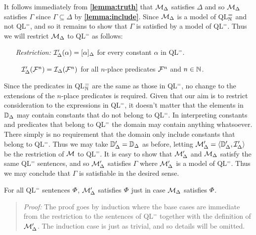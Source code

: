 It follows immediately from \textbf{\ref{lemma:truth}} that $\mathcal{M}_\Delta$ satisfies $\Delta$ and so $\mathcal{M}_\Delta$ satisfies $\Gamma$ since $\Gamma\subseteq\Delta$ by \textbf{\ref{lemma:include}}. 
Since $\mathcal{M}_\Delta$ is a model of QL$^=_{\mathbb{N}}$ and not QL$^=$, and so it remains to show that $\Gamma$ is satisfied by a model of QL$^=$.
Thus we will restrict $\mathcal{M}_\Delta$ to QL$^=$ as follows: 
  \begin{enumerate}[leftmargin=1.5in]
    \item[\it Restriction:] $\mathcal{I}'_\Delta(\alpha)=[\alpha]_\Delta$ for every constant $\alpha$ in QL$^=$.
    \item[~] $\mathcal{I}'_\Delta(\mathcal{F}^n)=\mathcal{I}_\Delta(\mathcal{F}^n)$ for all $n$-place predicates $\mathcal{F}^n$ and $n\in\mathbb{N}$. 
  \end{enumerate}
Since the predicates in QL$^=_{\mathbb{N}}$ are the same as those in QL$^=$, no change to the extensions of the $n$-place predicates is required.
Given that our aim is to restrict consideration to the expressions in QL$^=$, it doesn't matter that the elements in $\mathbb{D}_\Delta$ may contain constants that do not belong to QL$^=$.
In interpreting constants and predicates that belong to QL$^=$ the domain may contain anything whatsoever.
There simply is no requirement that the domain only include constants that belong to QL$^=$.
Thus we may take $\mathbb{D}'_\Delta=\mathbb{D}_\Delta$ as before, letting $\mathcal{M}'_\Delta=\langle\mathbb{D}'_\Delta,\mathcal{I}'_\Delta\rangle$ be the restriction of $\mathcal{M}$ to QL$^=$. 
It is easy to show that $\mathcal{M}'_\Delta$ and $\mathcal{M}_\Delta$ satisfy the same QL$^=$ sentences, and so $\mathcal{M}'_\Delta$ satisfies $\Gamma$ where $\mathcal{M}'_\Delta$ is a model of QL$^=$. 
Thus we may conclude that $\Gamma$ is satisfiable in the desired sense. 

\begin{Lthm} \label{lemma:satrest}
  For all QL$^=$ sentences $\varPhi$, $\mathcal{M}'_\Delta$ satisfies $\varPhi$ just in case $\mathcal{M}_\Delta$ satisfies $\varPhi$.
\end{Lthm}

\begin{quote} 
  \textit{Proof:} The proof goes by induction where the base cases are immediate from the restriction to the sentences of QL$^=$ together with the definition of $\mathcal{M}'_\Delta$.
  The induction case is just as trivial, and so details will be omitted.
\end{quote}

